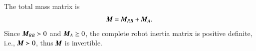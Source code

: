 The total mass matrix is
\begin{align}
\emph{\textbf{M}}=\emph{\textbf{M}}_{RB}+\emph{\textbf{M}}_{A}.
\end{align}
Since $\emph{\textbf{M}}_{RB}\succ 0$ and $\emph{\textbf{M}}_{A}\succeq 0$, the complete robot inertia matrix is positive definite, i.e., $\emph{\textbf{M}}\succ 0$, thus $\emph{\textbf{M}}$ is invertible.  








